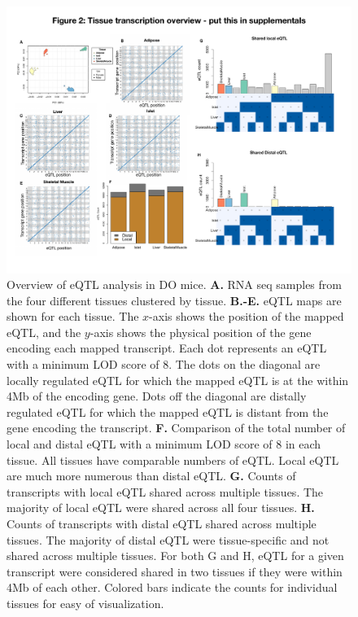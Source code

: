 \documentclass[
]{article}
\begin{document}
\begin{figure}[ht!]
\includegraphics[width=\textwidth]{Figures/Supp_Fig1_eQTL.pdf} 
\caption{Overview of eQTL analysis in DO mice. \textbf{A.} RNA seq 
samples from the four different tissues clustered by tissue. 
\textbf{B.-E.} eQTL maps are shown for each tissue. The $x$-axis 
shows the position of the mapped eQTL, and the $y$-axis shows the 
physical position of the gene encoding each mapped transcript. 
Each dot represents an eQTL with a minimum LOD score of 8. The dots 
on the diagonal are locally regulated eQTL for which the mapped eQTL 
is at the within 4Mb of the encoding gene. Dots off the diagonal are 
distally regulated eQTL for which the mapped eQTL is distant from the 
gene encoding the transcript. \textbf{F.} Comparison of the total number 
of local and distal eQTL with a minimum LOD score of 8 in each tissue. 
All tissues have comparable numbers of eQTL. Local eQTL are much more 
numerous than distal eQTL. \textbf{G.} Counts of transcripts with local 
eQTL shared across multiple tissues. The majority of local eQTL were 
shared across all four tissues. \textbf{H.} Counts of transcripts with 
distal eQTL shared across multiple tissues. The majority of distal eQTL 
were tissue-specific and not shared across multiple tissues. For both G 
and H, eQTL for a given transcript were considered shared in two tissues 
if they were within 4Mb of each other. Colored bars indicate the counts 
for individual tissues for easy of visualization.
}
\label{fig:eQTL}
\end{figure}
\end{document}
